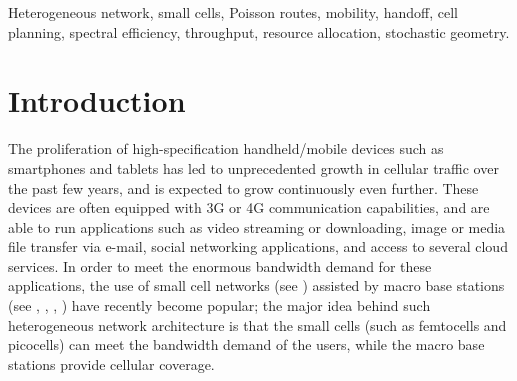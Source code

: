 \documentclass[10pt,journal]{IEEEtran}
\begin{document}
\begin{keywords}
Heterogeneous network, small cells, Poisson routes, mobility,  handoff, cell planning,
spectral efficiency, throughput, resource allocation, stochastic geometry.
\end{keywords}




\section{Introduction}\label{section:introduction}
The proliferation of high-specification handheld/mobile devices such as smartphones and tablets has led to unprecedented 
growth in cellular traffic over the past few years, and is expected to grow continuously even further. These devices are 
often equipped with 3G or 4G communication capabilities, and are able to run applications such as video streaming or downloading, image or 
media file transfer via e-mail, social networking applications, and access to several cloud services. 
In order to meet the enormous bandwidth demand for these applications, the use of small cell networks 
(see \cite{andrews-etal12femtocells}) assisted by macro base stations (see \cite{pauli-etalYYhet-LTE-ICI-coordination}, 
\cite{stanze-weber13het-LTE-A}, \cite{nakamura-etal13trends-small-cell-LTE}, \cite{ishii-etal12novel-architecture-LTE-B}) have 
recently become popular; the major idea behind such heterogeneous network architecture is that the small cells 
(such as femtocells and picocells) can meet the bandwidth demand of the users, while the macro base stations provide cellular coverage.
\end{document}
